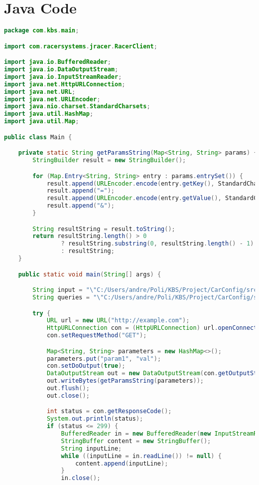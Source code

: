 \documentclass[a4paper,12pt]{report}
\begin{document}
\section{Java Code}
\lstset{style=mystyle}
\begin{lstlisting}[language=Java]
package com.kbs.main;

import com.racersystems.jracer.RacerClient;

import java.io.BufferedReader;
import java.io.DataOutputStream;
import java.io.InputStreamReader;
import java.net.HttpURLConnection;
import java.net.URL;
import java.net.URLEncoder;
import java.nio.charset.StandardCharsets;
import java.util.HashMap;
import java.util.Map;

public class Main {

    private static String getParamsString(Map<String, String> params) {
        StringBuilder result = new StringBuilder();

        for (Map.Entry<String, String> entry : params.entrySet()) {
            result.append(URLEncoder.encode(entry.getKey(), StandardCharsets.UTF_8));
            result.append("=");
            result.append(URLEncoder.encode(entry.getValue(), StandardCharsets.UTF_8));
            result.append("&");
        }

        String resultString = result.toString();
        return resultString.length() > 0
                ? resultString.substring(0, resultString.length() - 1)
                : resultString;
    }

    public static void main(String[] args) {

        String input = "\"C:/Users/andre/Poli/KBS/Project/CarConfig/src/com/kbs/racer/CarOntology.racer\"";
        String queries = "\"C:/Users/andre/Poli/KBS/Project/CarConfig/src/com/kbs/racer/OntologyEvaluation.racer\"";

        try {
            URL url = new URL("http://example.com");
            HttpURLConnection con = (HttpURLConnection) url.openConnection();
            con.setRequestMethod("GET");

            Map<String, String> parameters = new HashMap<>();
            parameters.put("param1", "val");
            con.setDoOutput(true);
            DataOutputStream out = new DataOutputStream(con.getOutputStream());
            out.writeBytes(getParamsString(parameters));
            out.flush();
            out.close();

            int status = con.getResponseCode();
            System.out.println(status);
            if (status <= 299) {
                BufferedReader in = new BufferedReader(new InputStreamReader(con.getInputStream()));
                StringBuffer content = new StringBuffer();
                String inputLine;
                while ((inputLine = in.readLine()) != null) {
                    content.append(inputLine);
                }
                in.close();


\end{lstlisting}
\end{document}
